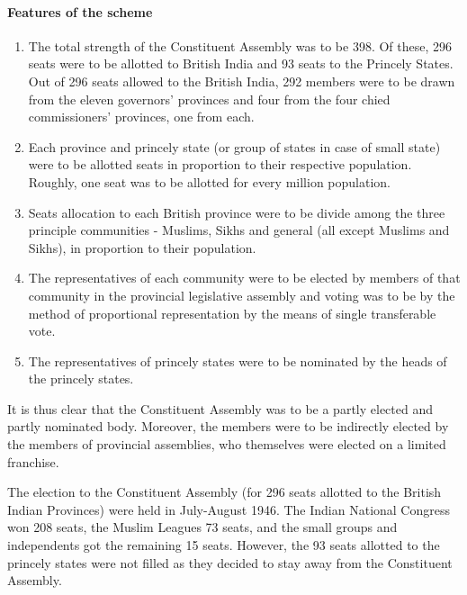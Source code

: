 \begin{multicol}{2}
\paragraph{Features of the scheme}
\begin{enumerate}
  \item The total strength of the Constituent Assembly was to be 398. Of these, 296 seats were to be allotted to British India and 93 seats to the Princely States. Out of 296 seats allowed to the British India, 292 members were to be drawn from the eleven governors' provinces and four from the four chied commissioners' provinces, one from each.
  \item Each province and princely state (or group of states in case of small state) were to be allotted seats in proportion to their respective population. Roughly, one seat was to be allotted for every million population.
  \item Seats allocation to each British province were to be divide among the three principle communities - Muslims, Sikhs and general (all except Muslims and Sikhs), in proportion to their population.
  \item The representatives of each community were to be elected by members of that community in the provincial legislative assembly and voting was to be by the method of proportional representation by the means of single transferable vote.
  \item The representatives of princely states were to be nominated by the heads of the princely states.
\end{enumerate}

It is thus clear that the Constituent Assembly was to be a partly elected and partly nominated body. Moreover, the members were to be indirectly elected by the members of provincial assemblies, who themselves were elected on a limited franchise.

The election to the Constituent Assembly (for 296 seats allotted to the British Indian Provinces) were held in July-August 1946. The Indian National Congress won 208 seats, the Muslim Leagues 73 seats, and the small groups and independents got the remaining 15 seats. However, the 93 seats allotted to the princely states were not filled as they decided to stay away from the Constituent Assembly.


\end{multicol}
